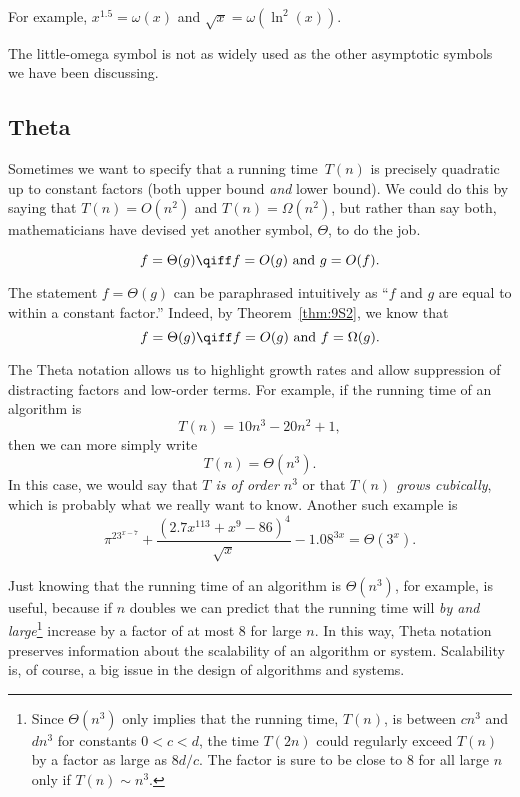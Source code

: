 For example, $x^{1.5} = \omega(x)$ and $\sqrt{x} = \omega(\ln^2(x))$.

The little-omega symbol is not as widely used as the other asymptotic
symbols we have been discussing.


\subsection{\index{$\Theta()$}Theta}

Sometimes we want to specify that a running time~$T(n)$ is precisely
quadratic up to constant factors (both upper bound \emph{and} lower
bound).  We could do this by saying that $T(n) = O(n^2)$ and $T(n) =
\Omega(n^2)$, but rather than say both, mathematicians have devised
yet another symbol, $\Theta$, to do the job.

\begin{definition}\label{def:Theta}
\[
    f = \Theta(g)
    \qiff
    f=O(g) \text{ and } g=O(f).
\]
\end{definition}

The statement $f = \Theta(g)$ can be paraphrased intuitively as
``$f$ and $g$ are equal to within a constant factor.''  Indeed, by
Theorem~\ref{thm:9S2}, we know that
\begin{equation*}
    f = \Theta(g) \qiff \text{$f = O(g)$ and $f = \Omega(g)$}.
\end{equation*}

The Theta notation allows us to highlight growth rates and allow
suppression of distracting factors and low-order terms.  For example,
if the running time of an algorithm is
\[
T(n) = 10n^3 - 20n^2 + 1,
\]
then we can more simply write
\[
T(n) = \Theta(n^3).
\]
In this case, we would say that \emph{$T$ is of order $n^3$} or that
\emph{$T(n)$ grows cubically}, which is probably what we really want
to know.  Another such example is
\[
{{\pi^23^{x-7} + \frac{(2.7x^{113} + x^9- 86)^4}{\sqrt{x}} - 1.08^{3x}}} =
\Theta(3^x).
\]

Just knowing that the running time of an algorithm is $\Theta(n^3)$,
for example, is useful, because if $n$ doubles we can predict that the
running time will \emph{by and large}\footnote{Since $\Theta(n^3)$
  only implies that the running time, $T(n)$, is between $cn^3$ and
  $dn^3$ for constants $0<c<d$, the time $T(2n)$ could regularly
  exceed $T(n)$ by a factor as large as $8d/c$.  The factor is sure to
  be close to 8 for all large $n$ only if $T(n) \sim n^3$.} increase
by a factor of at most $8$ for large $n$.  In this way, Theta notation
preserves information about the scalability of an algorithm or system.
Scalability is, of course, a big issue in the design of algorithms and
systems.


